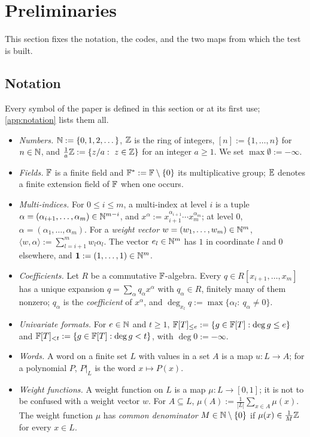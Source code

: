 \section{Preliminaries}\label{sec:prelim}

This section fixes the notation, the codes, and the two maps from which the test is built.

\subsection{Notation}\label{sec:notation}

Every symbol of the paper is defined in this section or at its first use; \cref{app:notation}
lists them all.

\begin{itemize}
\item \emph{Numbers.} $\mathbb{N}:=\{0,1,2,\dots\}$, $\mathbb{Z}$ is the ring of integers, $[n]:=\{1,\dots,n\}$
for $n\in\mathbb{N}$, and $\frac1a\mathbb{Z}:=\{z/a:\ z\in\mathbb{Z}\}$ for an integer $a\ge1$. We set
$\max\emptyset:=-\infty$.
\item \emph{Fields.} $\mathbb{F}$ is a finite field and $\mathbb{F}^*:=\mathbb{F}\setminus\{0\}$ its multiplicative
group; $\mathbb{E}$ denotes a finite extension field of $\mathbb{F}$ when one occurs.
\item \emph{Multi-indices.} For $0\le i\le m$, a multi-index at level $i$ is a tuple
$\alpha=(\alpha_{i+1},\dots,\alpha_m)\in\mathbb{N}^{m-i}$, and
$x^\alpha:=x_{i+1}^{\alpha_{i+1}}\cdots x_m^{\alpha_m}$; at level $0$,
$\alpha=(\alpha_1,\dots,\alpha_m)$. For a \emph{weight vector} $w=(w_1,\dots,w_m)\in\mathbb{N}^m$,
$\langle w,\alpha\rangle:=\sum_{l=i+1}^mw_l\alpha_l$. The vector $e_l\in\mathbb{N}^m$ has $1$ in
coordinate $l$ and $0$ elsewhere, and $\mathbf 1:=(1,\dots,1)\in\mathbb{N}^m$.
\item \emph{Coefficients.} Let $R$ be a commutative $\mathbb{F}$-algebra. Every
$q\in R[x_{i+1},\dots,x_m]$ has a unique expansion $q=\sum_\alpha q_\alpha x^\alpha$ with
$q_\alpha\in R$, finitely many of them nonzero; $q_\alpha$ is the \emph{coefficient} of
$x^\alpha$, and $\deg_{x_l}q:=\max\{\alpha_l:\ q_\alpha\ne0\}$.
\item \emph{Univariate formats.} For $e\in\mathbb{N}$ and $t\ge1$,
$\mathbb{F}[T]_{\le e}:=\{g\in\mathbb{F}[T]:\deg g\le e\}$ and $\mathbb{F}[T]_{<t}:=\{g\in\mathbb{F}[T]:\deg g<t\}$, with
$\deg0:=-\infty$.
\item \emph{Words.} A word on a finite set $L$ with values in a set $A$ is a map $u:L\to A$;
for a polynomial $P$, $P|_L$ is the word $x\mapsto P(x)$.
\item \emph{Weight functions.} A weight function on $L$ is a map $\mu:L\to[0,1]$; it is not
to be confused with a weight vector $w$. For $A\subseteq L$,
$\mu(A):=\frac1{|L|}\sum_{x\in A}\mu(x)$. The weight function $\mu$ has \emph{common
denominator} $M\in\mathbb{N}\setminus\{0\}$ if $\mu(x)\in\frac1M\mathbb{Z}$ for every $x\in L$.
\end{itemize}

